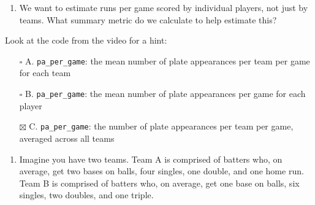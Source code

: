 \documentclass[
]{article}
\newenvironment{Shaded}{\begin{snugshade}}{\end{snugshade}}
\newcommand{\DataTypeTok}[1]{\textcolor[rgb]{0.13,0.29,0.53}{#1}}
\newcommand{\DecValTok}[1]{\textcolor[rgb]{0.00,0.00,0.81}{#1}}
\newcommand{\KeywordTok}[1]{\textcolor[rgb]{0.13,0.29,0.53}{\textbf{#1}}}
\newcommand{\NormalTok}[1]{#1}
\newcommand{\OperatorTok}[1]{\textcolor[rgb]{0.81,0.36,0.00}{\textbf{#1}}}
\newcommand{\StringTok}[1]{\textcolor[rgb]{0.31,0.60,0.02}{#1}}
\providecommand{\tightlist}{%
  \setlength{\itemsep}{0pt}\setlength{\parskip}{0pt}}
\begin{document}
\begin{enumerate}
\def\labelenumi{\arabic{enumi}.}
\setcounter{enumi}{1}
\tightlist
\item
  We want to estimate runs per game scored by individual players, not
  just by teams. What summary metric do we calculate to help estimate
  this?
\end{enumerate}

Look at the code from the video for a hint:

\begin{Shaded}
\end{Shaded}

\begin{itemize}
\tightlist
\item[$\square$]
  A. \texttt{pa\_per\_game}: the mean number of plate appearances per
  team per game for each team
\item[$\square$]
  B. \texttt{pa\_per\_game}: the mean number of plate appearances per
  game for each player
\item[$\boxtimes$]
  C. \texttt{pa\_per\_game}: the number of plate appearances per team
  per game, averaged across all teams
\end{itemize}

\begin{enumerate}
\def\labelenumi{\arabic{enumi}.}
\setcounter{enumi}{2}
\tightlist
\item
  Imagine you have two teams. Team A is comprised of batters who, on
  average, get two bases on balls, four singles, one double, and one
  home run. Team B is comprised of batters who, on average, get one base
  on balls, six singles, two doubles, and one triple.
\end{enumerate}
\end{document}
